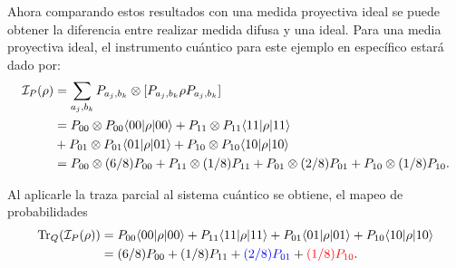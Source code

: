 Ahora comparando estos resultados con una medida proyectiva ideal se puede obtener la diferencia entre realizar medida difusa y una ideal. Para una media proyectiva ideal, el instrumento cuántico para este ejemplo en específico estará dado por: \begin{equation}\label{proyectiva_ideal_ejemplo}
    \begin{split}
        \mathcal{I}_P(\rho)&=\sum_{a_j,b_k}P_{a_j,b_k}\otimes[P_{a_j,b_k}\rho P_{a_j,b_k}]\\
        &=P_{00}\otimes P_{00} \langle 00|\rho|00\rangle + P_{11}\otimes P_{11} \langle 11|\rho|11\rangle\\
        &+P_{01} \otimes P_{01}\langle 01|\rho|01\rangle +P_{10} \otimes P_{10} \langle 10|\rho|10\rangle\\
        &=P_{00}\otimes (6/8)P_{00} + P_{11}\otimes (1/8)P_{11}+P_{01} \otimes (2/8)P_{01} +P_{10} \otimes (1/8)P_{10}.\\
    \end{split}
\end{equation}


Al aplicarle la traza parcial al sistema cuántico se obtiene, el mapeo de probabilidades \begin{equation}\label{traza_SP_ejemplo1}
    \begin{split}
        {\rm Tr}_Q(\mathcal{I}_P(\rho)) &= P_{00} \langle 00|\rho|00\rangle + P_{11} \langle 11|\rho|11\rangle+P_{01}\langle 01|\rho|01\rangle +P_{10} \langle 10|\rho|10\rangle\\
        &=(6/8)P_{00} + (1/8)P_{11}+{\color{blue}(2/8)P_{01}} + {\color{red}(1/8)P_{10}}.\\
    \end{split}
\end{equation}


